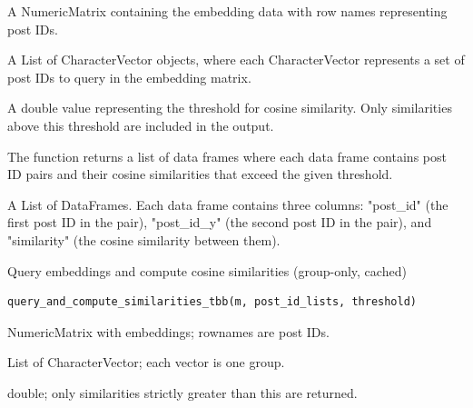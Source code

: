 \documentclass[a4paper]{book}
\begin{document}
\begin{Arguments}
\begin{ldescription}
\item[\code{m}] A NumericMatrix containing the embedding data with row names representing post IDs.

\item[\code{post\_id\_lists}] A List of CharacterVector objects, where each CharacterVector represents a set of post IDs to query in the embedding matrix.

\item[\code{threshold}] A double value representing the threshold for cosine similarity. Only similarities above this threshold are included in the output.
\end{ldescription}
\end{Arguments}
%
\begin{Details}
The function returns a list of data frames where each data frame contains post ID pairs and their cosine similarities that exceed the given threshold.
\end{Details}
%
\begin{Value}
A List of DataFrames. Each data frame contains three columns: "post\_id" (the first post ID in the pair), "post\_id\_y" (the second post ID in the pair), and "similarity" (the cosine similarity between them).
\end{Value}
%
\begin{Description}
Query embeddings and compute cosine similarities (group-only, cached)
\end{Description}
%
\begin{Usage}
\begin{verbatim}
query_and_compute_similarities_tbb(m, post_id_lists, threshold)
\end{verbatim}
\end{Usage}
%
\begin{Arguments}
\begin{ldescription}
\item[\code{m}] NumericMatrix with embeddings; rownames are post IDs.

\item[\code{post\_id\_lists}] List of CharacterVector; each vector is one group.

\item[\code{threshold}] double; only similarities strictly greater than this are returned.
\end{ldescription}
\end{Arguments}
\end{document}
